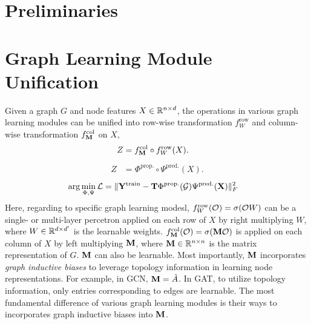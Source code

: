 \documentclass{article} %
\begin{document}
	\section{Preliminaries}
	
	\section{Graph Learning Module Unification}
	
	Given a graph $G$ and node features $X\in{\mathbb{R}}^{n\times d}$, the operations in various graph learning modules can be unified into row-wise transformation $f_W^{\mathrm{row}}$ and column-wise transformation $f_{{\mathbf{M}}}^{\mathrm{col}}$ on $X$,
	\begin{equation}
		\label{equ:uni_grl}
		\begin{aligned}
			Z&=f_{{\mathbf{M}}}^{\mathrm{col}}\circ f_W^{\mathrm{row}}(X).
		\end{aligned}
	\end{equation}
	\begin{equation}
		\label{equ:uni_grl}
		\begin{aligned}
			Z&=\Phi^{\mathrm{prop.}}\circ\Psi^{\mathrm{pred.}}(X).
		\end{aligned}
	\end{equation}
	\begin{equation}
		\label{equ:square}
		\begin{aligned}
			\arg\min_{\Phi,\Psi}{\mathcal{L}}&=\|{\mathbf{Y}}^{\textrm{train}}-{\mathbf{T}}\Phi^{\mathrm{prop.}}({\mathcal{G}})\Psi^{\mathrm{pred.}}({\mathbf{X}})\|^2_F
		\end{aligned}
	\end{equation}
	Here, regarding to specific graph learning modesl, $f_W^{\mathrm{row}}({\mathcal{O}})=\sigma({\mathcal{O}} W)$ can be a single- or multi-layer percetron applied on each row of $X$ by right multiplying $W$, where $W\in{\mathbb{R}}^{d\times d^{\prime}}$ is the learnable weights.
	$f_{{\mathbf{M}}}^{\mathrm{col}}({\mathcal{O}})=\sigma({\mathbf{M}}{\mathcal{O}})$ is applied on each column of $X$ by left multiplying ${\mathbf{M}}$, where ${\mathbf{M}}\in{\mathbb{R}}^{n\times n}$ is the matrix representation of $G$.
	${\mathbf{M}}$ can also be learnable.
	Most importantly, ${\mathbf{M}}$ incorporates \emph{graph inductive biases} to leverage topology information in learning node representations.
	For example, in GCN, ${\mathbf{M}}=\hat A$.
	In GAT, to utilize topology information, only entries corresponding to edges are learnable.
	The most fundamental difference of various graph learning modules is their ways to incorporates graph inductive biases into ${\mathbf{M}}$.
\end{document}
